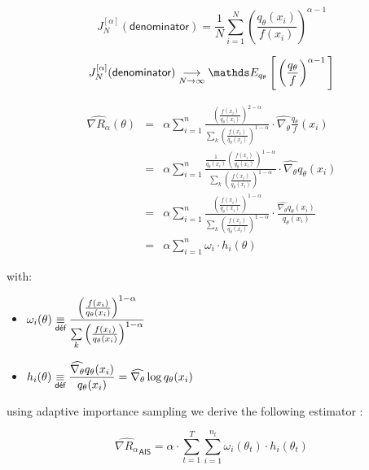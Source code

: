 $$J_N^{[\alpha]}(\textsf{denominator}) = \frac 1 N \sum\limits_{i=1}^N \left(\frac{q_\theta(x_i)}{f(x_i)}\right)^{\alpha - 1}$$

$$J_N^{[\alpha]}(\textsf{denominator}) \tend N \infty \esperanceloi {q_\theta} { \left(\frac{q_\theta}{f}\right) ^{\alpha-1}}$$

\[
	\begin{array}{rcl}
		
	\widehat{\nabla R_\alpha}(\theta)
 &=& 
 \displaystyle{ 
 \alpha  
 \sum\limits_{i=1}^{n}  
 \frac{\left( \frac{f(x_i)}{q_\theta(x_i)} \right)^{2-\alpha}}
 {\sum\limits_k 
 \left(\frac{f(x_i)}{q_\theta(x_i)}\right)^{1-\alpha}} 
 \cdot \widehat{\nabla_\theta} \frac{q_\theta}{f}(x_i)
 }
		\\
&=& \displaystyle{ \alpha  \sum\limits_{i=1}^{n}  \frac{\frac{1}{q_\theta(x_i)}\left( \frac{f(x_i)}{q_\theta(x_i)} \right)^{1-\alpha}}{\sum\limits_k \left(\frac{f(x_i)}{q_\theta(x_i)}\right)^{1-\alpha}} \cdot \widehat{\nabla_\theta} {q_\theta}(x_i)}
  \\
  &=&\displaystyle{ \alpha  \sum\limits_{i=1}^{n}  \frac{\left( \frac{f(x_i)}{q_\theta(x_i)} \right)^{1-\alpha}}{\sum\limits_k \left(\frac{f(x_i)}{q_\theta(x_i)}\right)^{1-\alpha}} \cdot \frac{\widehat{\nabla_\theta} {q_\theta}(x_i)}{q_\theta(x_i)}}
  \\
	&=& \displaystyle{ \alpha \sum\limits_{i=1}^{n} \omega_i \cdot h_i(\theta)}
\end{array}
\]

	with:
	\begin{itemize}
	
		\item $\displaystyle{\omega_i(\theta) \isdef \frac{\left( \frac{f(x_i)}{q_\theta(x_i)} \right)^{1-\alpha}}{\sum\limits_k \left(\frac{f(x_i)}{q_\theta(x_i)}\right)^{1-\alpha}}}$
		\item $\displaystyle{h_i(\theta) \isdef \frac{\widehat{\nabla_\theta} {q_\theta}(x_i)}{q_\theta(x_i)}} = \widehat{\nabla_\theta} \log q_\theta(x_i)$
	\end{itemize}


using adaptive importance sampling we derive the following estimator :


$$\boxed{\widehat{\nabla R_\alpha}_{\textsf{AIS}} = \alpha \cdot \sum\limits_{t=1}^T \sum\limits_{i = 1}^{n_t} \omega_i(\theta_t) \cdot h_i(\theta_t)}$$



